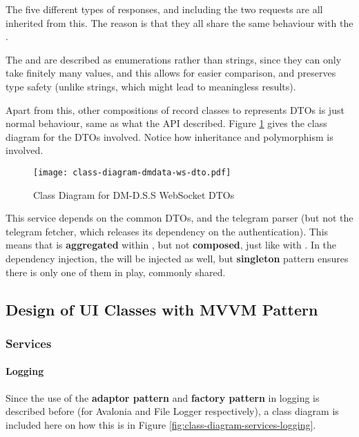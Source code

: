 The five different types of responses, and including the two requests are all inherited from this. The reason is that they all share the same behaviour with the .

The  and  are described as enumerations rather than strings, since they can only take finitely many values, and this allows for easier comparison, and preserves type safety (unlike strings, which might lead to meaningless results).

Apart from this, other compositions of record classes to represents DTOs is just normal behaviour, same as what the API described. Figure \ref{fig:class-diagram-dmdata-ws-dto} gives the class diagram for the DTOs involved. Notice how inheritance and polymorphism is involved.

\begin{figure}[htp]
    \centering
    \texttt{[image: class-diagram-dmdata-ws-dto.pdf]}
    \caption{Class Diagram for DM-D.S.S WebSocket DTOs}
    \label{fig:class-diagram-dmdata-ws-dto}
\end{figure}

This service depends on the common DTOs, and the telegram parser (but not the telegram fetcher, which releases its dependency on the authentication). This means that  is \textbf{aggregated} within , but not \textbf{composed}, just like with . In the dependency injection, the  will be injected as well, but \textbf{singleton} pattern ensures there is only one of them in play, commonly shared.

\subsection{Design of UI Classes with MVVM Pattern}

\subsubsection{Services}

\paragraph{Logging}

Since the use of the \textbf{adaptor pattern} and \textbf{factory pattern} in logging is described before (for Avalonia and File Logger respectively), a class diagram is included here on how this is in Figure \ref{fig:class-diagram-services-logging}.

